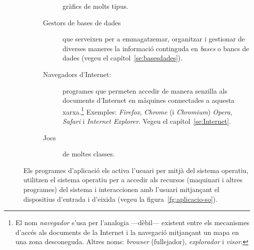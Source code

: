\begin{description}
\begin{description}
\begin{description}
                  gràfics de molts tipus.
                \item[Gestors de bases de dades] \label{pg:BD} que
                  serveixen per a emmagatzemar, organitzar i gestionar
                  de diverses maneres la informació continguda en
                  \emph{bases} o bancs de dades (vegeu el
                  capítol~\ref{se:basesdades}).
                \item[Navegadors d'Internet:] programes que permeten
                  accedir de manera senzilla als documents d'Internet
                  en màquines connectades a aquesta xarxa.\footnote{El
                    nom \emph{navegador} s'usa per l'analogia
                    ---dèbil--- existent entre els mecanismes d'accés
                    als documents de la Internet i la navegació
                    mitjançant un mapa en una zona desconeguda. Altres
                    noms: \emph{browser} (fullejador),
                    \emph{explorador} i \emph{visor}.}
                  Exemples: %
                  \emph{Firefox}, \emph{Chrome} (i \emph{Chromium})
                  \emph{Opera}, \emph{Safari} i \emph{Internet
                    Explorer}.  Vegeu el
                  capítol~\ref{se:Internet}.\label{pg:navegadors}
                \item[Jocs] de moltes classes.
                \end{description}
        \end{description}
        Els programes d'aplicació els activa l'usuari per mitjà del
        sistema operatiu, utilitzen el sistema operatiu per a accedir
        als recursos (maquinari i altres programes) del sistema i
        interaccionen amb l'usuari mitjançant el dispositius d'entrada
        i d'eixida (vegeu la figura~\ref{fg:aplicacio-so}).
\end{description}

